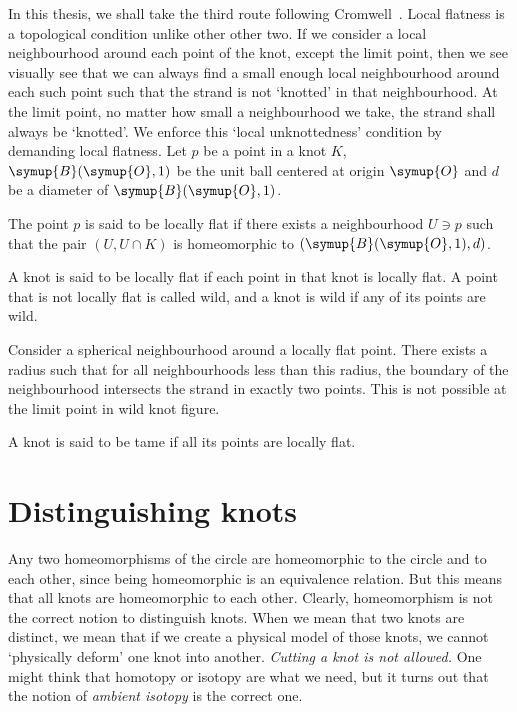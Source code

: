 In this thesis, we shall take the third route following Cromwell~\cite[chp.~1]{cromwell}. Local flatness is a topological condition unlike other other two. If we consider a local neighbourhood around each point of the knot, except the limit point, then we see visually see that we can always find a small enough local neighbourhood around each such point such that the strand is not `knotted' in that neighbourhood. At the limit point, no matter how small a neighbourhood we take, the strand shall always be `knotted'. We enforce this `local unknottedness' condition by demanding local flatness. Let \(p\) be a point in a knot \(K\), \(\symup{B}(\symup{O}, 1)\) be the unit ball centered at origin \(\symup{O}\) and \(d\) be a diameter of \(\symup{B}(\symup{O}, 1)\).
\begin{defn}
    The point \(p\) is said to be locally flat if there exists a neighbourhood \(U \ni p\) such that the pair \((U, U \cap K)\) is homeomorphic to \((\symup{B}(\symup{O}, 1), d)\).

    A knot is said to be locally flat if each point in that knot is locally flat. A point that is not locally flat is called wild, and a knot is wild if any of its points are wild.
\end{defn}

Consider a spherical neighbourhood around a locally flat point. There exists a radius such that for all neighbourhoods less than this radius, the boundary of the neighbourhood intersects the strand in exactly two points. This is not possible at the limit point in wild knot figure.

\begin{defn}
    A knot is said to be tame if all its points are locally flat.
\end{defn}

\section{Distinguishing knots}

Any two homeomorphisms of the circle are homeomorphic to the circle and to each other, since being homeomorphic is an equivalence relation. But this means that all knots are homeomorphic to each other. Clearly, homeomorphism is not the correct notion to distinguish knots. When we mean that two knots are distinct, we mean that if we create a physical model of those knots, we cannot `physically deform' one knot into another. \textit{Cutting a knot is not allowed.} One might think that homotopy or isotopy are what we need, but it turns out that the notion of \textit{ambient isotopy} is the correct one.


